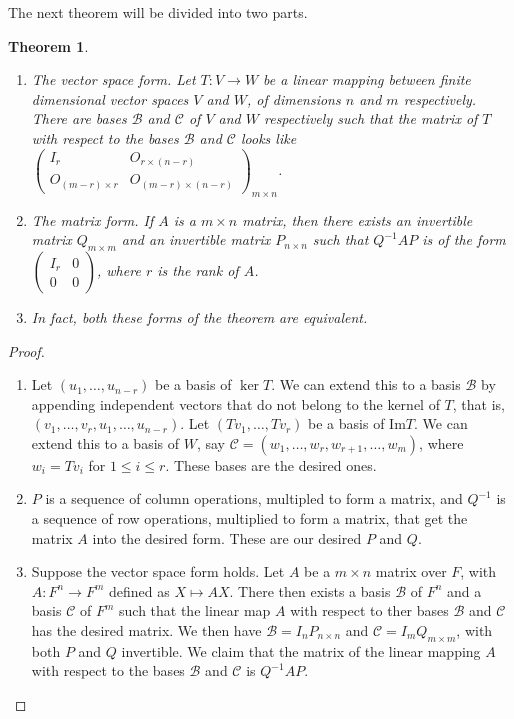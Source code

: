 \documentclass[15pt,a4paper]{book}
\newtheorem{theorem}{Theorem}[chapter]
\theoremstyle{definition}
\newcommand{\mc}[1]{\mathcal{#1}}
\begin{document}
The next theorem will be divided into two parts.
\begin{theorem}
    \begin{enumerate}
        \item The vector space form. Let $T:V \to W$ be a linear mapping between finite dimensional vector spaces $V$ and $W$, of dimensions $n$ and $m$ respectively. There are bases $\mc{B}$ and $\mc{C}$ of $V$ and $W$ respectively such that the matrix of $T$ with respect to the bases $\mc{B}$ and $\mc{C}$ looks like $\begin{pmatrix}
            I_{r} & O_{r \times (n-r)} \\ O_{(m-r) \times r} & O_{(m-r) \times (n-r)}
        \end{pmatrix}_{m \times n}$.
        \item The matrix form. If $A$ is a $m \times n$ matrix, then there exists an invertible matrix $Q_{m \times m}$ and an invertible matrix $P_{n \times n}$ such that $Q^{-1}AP$ is of the form $\begin{pmatrix}
            I_{r} & 0 \\ 0 & 0
        \end{pmatrix}$, where $r$ is the rank of $A$.
        \item In fact, both these forms of the theorem are equivalent.
    \end{enumerate}
\end{theorem}
\begin{proof}
    \begin{enumerate}
        \item Let $(u_{1},\ldots,u_{n-r})$ be a basis of $\ker{T}$. We can extend this to a basis $\mc{B}$ by appending independent vectors that do not belong to the kernel of $T$, that is, $(v_{1},\ldots,v_{r},u_{1},\ldots,u_{n-r})$. Let $(Tv_{1},\ldots,Tv_{r})$ be a basis of $\text{Im}{T}$. We can extend this to a basis of $W$, say $\mc{C} = (w_{1},\ldots,w_{r},w_{r+1},\ldots,w_{m})$, where $w_{i} = Tv_{i}$ for $1 \leq i \leq r$. These bases are the desired ones.
        \item $P$ is a sequence of column operations, multipled to form a matrix, and $Q^{-1}$ is a sequence of row operations, multiplied to form a matrix, that get the matrix $A$ into the desired form. These are our desired $P$ and $Q$.
        \item Suppose the vector space form holds. Let $A$ be a $m \times n$ matrix over $F$, with $A:F^{n} \to F^{m}$ defined as $X \mapsto AX$. There then exists a basis $\mc{B}$ of $F^{n}$ and a basis $\mc{C}$ of $F^{m}$ such that the linear map $A$ with respect to ther bases $\mc{B}$ and $\mc{C}$ has the desired matrix. We then have $\mc{B} =I_{n}P_{n \times n}$ and $\mc{C} = I_{m}Q_{m \times m}$, with both $P$ and $Q$ invertible. We claim that the matrix of the linear mapping $A$ with respect to the bases $\mc{B}$ and $\mc{C}$ is $Q^{-1}AP$.
    \end{enumerate}
\end{proof}
\end{document}
